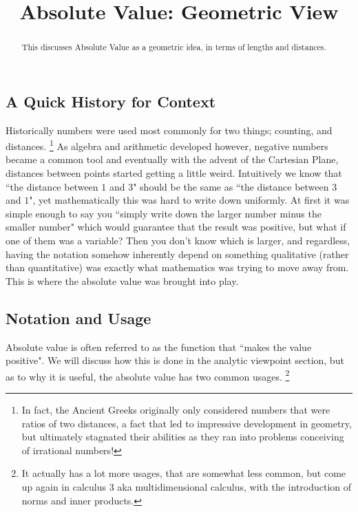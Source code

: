 \documentclass{ximeraXloud}
\title{Absolute Value: Geometric View}
\begin{document}
\begin{abstract}
    This discusses Absolute Value as a geometric idea, in terms of lengths and distances.
\end{abstract}
\maketitle

\subsection*{A Quick History for Context}
    Historically numbers were used most commonly for two things; counting, and distances.%
    \footnote{In fact, the Ancient Greeks originally only considered numbers that were ratios of two distances, a fact that led to impressive development in geometry, but ultimately stagnated their abilities as they ran into problems conceiving of irrational numbers!}
    As algebra and arithmetic developed however, negative numbers became a common tool and eventually with the advent of the Cartesian Plane, distances between points started getting a little weird. Intuitively we know that ``the distance between $1$ and $3$" should be the same as ``the distance between $3$ and $1$", yet mathematically this was hard to write down uniformly. At first it was simple enough to say you ``simply write down the larger number minus the smaller number" which would guarantee that the result was positive, but what if one of them was a variable? Then you don't know which is larger, and regardless, having the notation somehow inherently depend on something qualitative (rather than quantitative) was exactly what mathematics was trying to move away from. This is where the absolute value was brought into play.

\subsection*{Notation and Usage}
    Absolute value is often referred to as the function that ``makes the value positive". We will discuss how this is done in the analytic viewpoint section, but as to why it is useful, the absolute value has two common usages.%
    \footnote{It actually has a lot more usages, that are somewhat less common, but come up again in calculus 3 aka multidimensional calculus, with the introduction of norms and inner products.}
    
\end{document}
